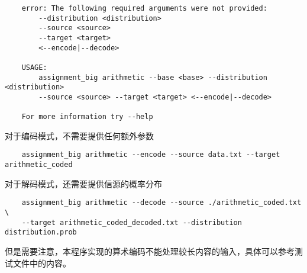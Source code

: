 \documentclass{ctexart}
\begin{document}
\begin{verbatim}
    error: The following required arguments were not provided:
        --distribution <distribution>
        --source <source>
        --target <target>
        <--encode|--decode>

    USAGE:
        assignment_big arithmetic --base <base> --distribution <distribution>
        --source <source> --target <target> <--encode|--decode>

    For more information try --help
\end{verbatim}

对于编码模式，不需要提供任何额外参数

\begin{verbatim}
    assignment_big arithmetic --encode --source data.txt --target arithmetic_coded
\end{verbatim}

对于解码模式，还需要提供信源的概率分布

\begin{verbatim}
    assignment_big arithmetic --decode --source ./arithmetic_coded.txt \
    --target arithmetic_coded_decoded.txt --distribution distribution.prob
\end{verbatim}

但是需要注意，本程序实现的算术编码不能处理较长内容的输入，具体可以参考测试文件中的内容。
\end{document}
